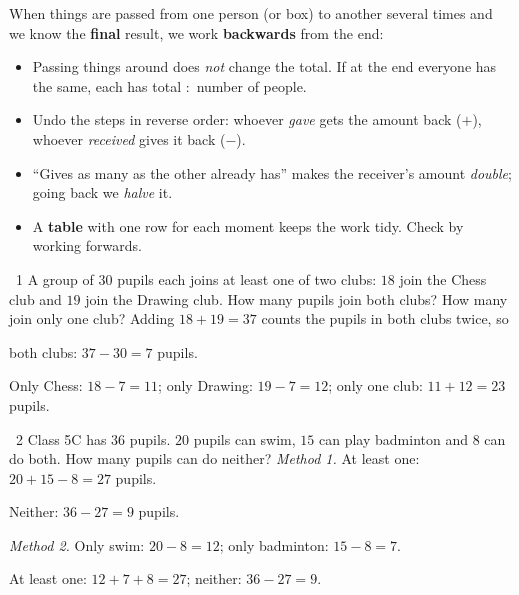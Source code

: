 \begin{knowbox}
When things are passed from one person (or box) to another several times and we know the \textbf{final} result, we work \textbf{backwards} from the end:
\begin{itemize}[leftmargin=1.4em,itemsep=3pt]
\item Passing things around does \emph{not} change the total. If at the end everyone has the same, each has total $:$ number of people.
\item Undo the steps in reverse order: whoever \emph{gave} gets the amount back ($+$), whoever \emph{received} gives it back ($-$).
\item ``Gives as many as the other already has'' makes the receiver's amount \emph{double}; going back we \emph{halve} it.
\item A \textbf{table} with one row for each moment keeps the work tidy. Check by working forwards.
\end{itemize}
\end{knowbox}
\gap
\begin{exbox}{\ExWord\ 1}
A group of $30$ pupils each joins at least one of two clubs: $18$ join the Chess club and $19$ join the Drawing club. How many pupils join both clubs? How many join only one club?
\guide
Adding $18+19=37$ counts the pupils in both clubs twice, so
\par both clubs: $37-30=7$ pupils.\par
Only Chess: $18-7=11$; only Drawing: $19-7=12$; only one club: $11+12=23$ pupils.
\begin{center}
\end{center}
\end{exbox}
\gap
\begin{exbox}{\ExWord\ 2}
Class 5C has $36$ pupils. $20$ pupils can swim, $15$ can play badminton and $8$ can do both. How many pupils can do neither?
\guide
\emph{Method 1.} At least one: $20+15-8=27$ pupils.\par Neither: $36-27=9$ pupils.\par
\emph{Method 2.} Only swim: $20-8=12$; only badminton: $15-8=7$.\par At least one: $12+7+8=27$; neither: $36-27=9$.
\begin{center}
\end{center}
\end{exbox}
